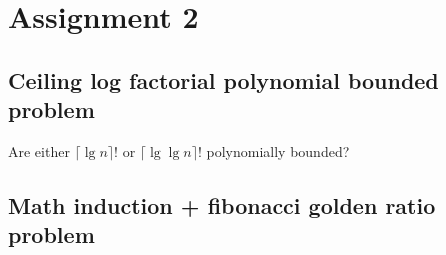 \chapter{Assignment 2}

\section{Ceiling log factorial polynomial bounded problem}
Are either $\lceil \lg n \rceil!$ or $\lceil \lg \lg n \rceil!$ polynomially bounded?
\section{Math induction + fibonacci golden ratio problem}
